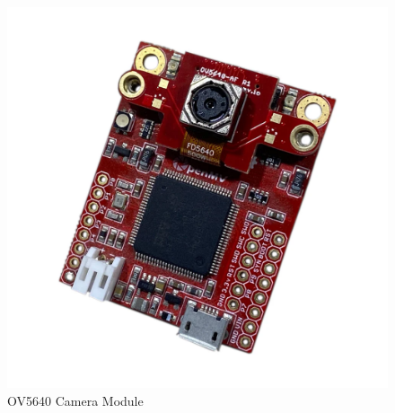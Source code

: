 \begin{figure}[h]
	\centering
	\includegraphics[width=0.5\linewidth]{assets/ch2/OV5640}
	\caption{OV5640 Camera Module}
	\label{fig:ov5640}
\end{figure}



